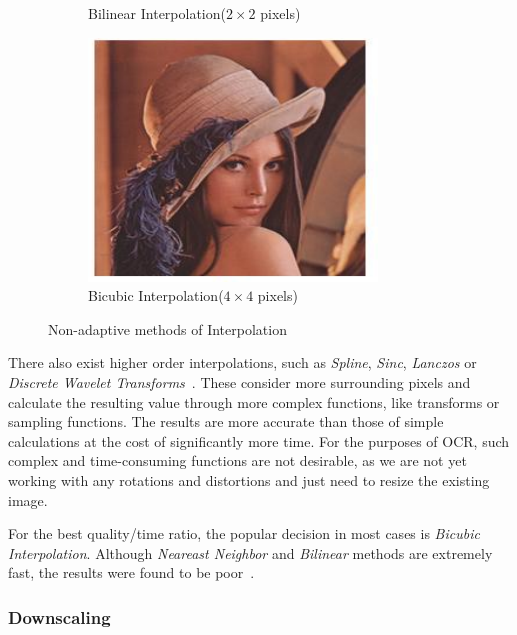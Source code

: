 \begin{figure}[H]
\begin{subfigure}{0.31\textwidth}
\caption{Bilinear Interpolation($2\times2$ pixels)} \label{fig:1b}
\end{subfigure}
\hspace*{\fill} %
\begin{subfigure}{0.31\textwidth}
\includegraphics[width=\linewidth]{img/preprocessing/interp_bicubic.pdf}
\caption{Bicubic Interpolation($4\times4$ pixels)} \label{fig:1c}
\end{subfigure}
\caption{Non-adaptive methods of Interpolation} \label{fig:1}
\end{figure}

There also exist higher order interpolations, such as \emph{Spline}, \emph{Sinc}, \emph{Lanczos} or \emph{Discrete Wavelet Transforms}~\cite{interpolation}. These consider more surrounding pixels and calculate the resulting value through more complex functions, like transforms or sampling functions. The results are more accurate than those of simple calculations at the cost of significantly more time. For the purposes of OCR, such complex and time-consuming functions are not desirable, as we are not yet working with any rotations and distortions and just need to resize the existing image.

For the best quality/time ratio, the popular decision in most cases is \emph{Bicubic Interpolation}. Although \emph{Neareast Neighbor} and \emph{Bilinear} methods are extremely fast, the results were found to be poor~\cite{interpolationComp}.

\subsubsection{Downscaling}

